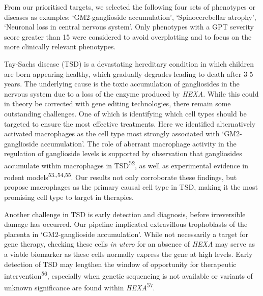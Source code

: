 \documentclass[
]{article}
\begin{document}
From our prioritised targets, we selected the following four sets of
phenotypes or diseases as examples: `GM2-ganglioside accumulation',
`Spinocerebellar atrophy', `Neuronal loss in central nervous system'.
Only phenotypes with a GPT severity score greater than 15 were
considered to avoid overplotting and to focus on the more clinically
relevant phenotypes.

Tay-Sachs disease (TSD) is a devastating hereditary condition in which
children are born appearing healthy, which gradually degrades leading to
death after 3-5 years. The underlying cause is the toxic accumulation of
gangliosides in the nervous system due to a loss of the enzyme produced
by \emph{HEXA}. While this could in theory be corrected with gene
editing technologies, there remain some outstanding challenges. One of
which is identifying which cell types should be targeted to ensure the
most effective treatments. Here we identified alternatively activated
macrophages as the cell type most strongly associated with
`GM2-ganglioside accumulation'. The role of aberrant macrophage activity
in the regulation of ganglioside levels is supported by observation that
gangliosides accumulate within macrophages in TSD\textsuperscript{52},
as well as experimental evidence in rodent
models\textsuperscript{53.,54,55}. Our results not only corroborate
these findings, but propose macrophages as the primary causal cell type
in TSD, making it the most promising cell type to target in therapies.

Another challenge in TSD is early detection and diagnosis, before
irreversible damage has occurred. Our pipeline implicated extravillous
trophoblasts of the placenta in `GM2-ganglioside accumulation'. While
not necessarily a target for gene therapy, checking these cells \emph{in
utero} for an absence of \emph{HEXA} may serve as a viable biomarker as
these cells normally express the gene at high levels. Early detection of
TSD may lengthen the window of opportunity for therapeutic
intervention\textsuperscript{56}, especially when genetic sequencing is
not available or variants of unknown significance are found within
\emph{HEXA}\textsuperscript{57}.
\end{document}
